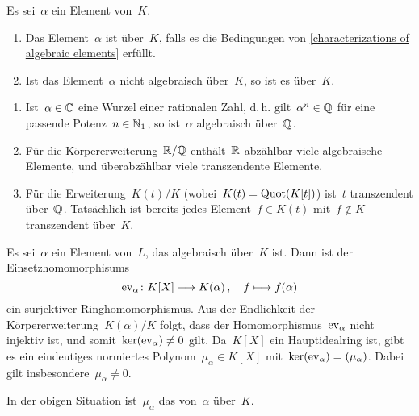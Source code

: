 \begin{definition}
  Es sei~$\alpha$ ein Element von~$K$.
  \begin{enumerate}
    \item
      Das Element~$\alpha$ ist  über~$K$, falls es die Bedingungen von \cref{characterizations of algebraic elements} erfüllt.
    \item
      Ist das Element~$\alpha$ nicht algebraisch über~$K$, so ist es  über~$K$.
  \end{enumerate}
\end{definition}

\newpage

\begin{example}
  \leavevmode
  \begin{enumerate} 
    \item
      Ist~$\alpha \in \mathbb{C}$ eine Wurzel einer rationalen Zahl, d.\,h. gilt~$\alpha^n \in \mathbb{Q}$ für eine passende Potenz~$n \in \mathbb{N}_1$, so ist~$\alpha$ algebraisch über~$\mathbb{Q}$.
    \item
      Für die Körpererweiterung~$\mathbb{R}/\mathbb{Q}$ enthält~$\mathbb{R}$ abzählbar viele algebraische Elemente, und überabzählbar viele transzendente Elemente.
    \item
      Für die Erweiterung~$K(t)/K$ (wobei~$K(t) = \operatorname{Quot}(K[t])$) ist~$t$ transzendent über~$\mathbb{Q}$.
      Tatsächlich ist bereits jedes Element~$f \in K(t)$ mit~$f \notin K$ transzendent über~$K$.
  \end{enumerate}
\end{example}

Es sei~$\alpha$ ein Element von~$L$, das algebraisch über~$K$ ist.
Dann ist der Einsetzhomomorphisums
\[
  \ev_\alpha
  \colon
  K[X] \to K(\alpha) \,,
  \quad
  f \mapsto f(\alpha)
\]
ein surjektiver Ringhomomorphismus.
Aus der Endlichkeit der Körpererweiterung~$K(\alpha)/K$ folgt, dass der Homomorphismus~$\operatorname{ev}_\alpha$ nicht injektiv ist, und somit~$\ker(\operatorname{ev}_\alpha) \neq 0$ gilt.
Da~$K[X]$ ein Hauptidealring ist, gibt es ein eindeutiges normiertes Polynom~$\mu_\alpha \in K[X]$ mit~$\ker(\operatorname{ev}_\alpha) = ( \mu_\alpha )$.
Dabei gilt insbesondere~$\mu_\alpha \neq 0$.

\begin{definition}
  In der obigen Situation ist~$\mu_\alpha$ das  von~$\alpha$ über~$K$.
\end{definition}

